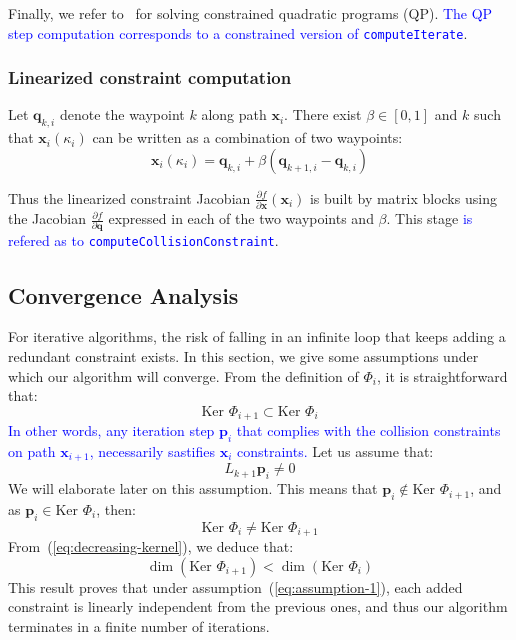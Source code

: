 \documentclass{tADR2e}
\newcommand\p{\mathbf{p}}
\newcommand\conf{\mathbf{q}}
\newcommand\xx{\mathbf{x}} %
\newcommand\tcolli{\kappa_i}
\newcommand\Jf{\Phi}
\newcommand\kernel{\mbox{Ker }}
\begin{document}
\vspace{0.4cm}

Finally, we refer to~\cite{nocedal2006numerical} for solving constrained quadratic 
programs (QP). \textcolor{blue}{The QP step computation corresponds to a constrained 
version of \texttt{computeIterate}}.


\vspace{0.2cm}

\subsubsection{Linearized constraint computation} \label{sec:lin_constr_compt}

Let $\conf_{k,i}$ denote the waypoint $k$ along path $\xx_i$.
There exist $\beta\in[0,1]$ and $k$ such that $\xx_i (\tcolli)$ can be written as a combination of two waypoints:
$$
\xx_i (\tcolli) = \conf_{k,i} + \beta (\conf_{k+1,i} - \conf_{k,i})
$$

Thus the linearized constraint Jacobian $\frac{\partial f}{\partial \xx}(\xx_i)$ 
is built by matrix 
blocks using the Jacobian $\frac{\partial f}{\partial \conf}$ expressed in 
each of the two waypoints and $\beta$. This stage \textcolor{blue}{is refered as 
to \texttt{computeCollisionConstraint}}.


\subsection{Convergence Analysis}
For iterative algorithms, the risk of falling in an infinite loop 
that keeps adding a redundant constraint exists.
In this section, we give some assumptions under which our 
algorithm will converge.
From the definition of $\Jf_{i}$, it is straightforward that:
\begin{equation}\label{eq:decreasing-kernel}
\kernel \Jf_{i+1} \subset \kernel \Jf_{i}
\end{equation}
\textcolor{blue}{In other words, any iteration step $\p_i$ that complies with the 
collision constraints on path $\xx_{i+1}$, necessarily sastifies $\xx_i$ constraints.}
Let us assume that:
\begin{equation}\label{eq:assumption-1}
L_{k+1}\p_i \not= 0
\end{equation}
We will elaborate later on this assumption. This means that 
$\p_{i}\notin\kernel \Jf_{i+1}$, and as $\p_{i}\in\kernel \Jf_{i}$, then:
$$
\kernel \Jf_i \not= \kernel \Jf_{i+1}
$$
From~(\ref{eq:decreasing-kernel}), we deduce that:
$$
\dim (\kernel \Jf_{i+1}) < \dim (\kernel \Jf_i)
$$
This result proves that under assumption~(\ref{eq:assumption-1}), each added constraint 
is linearly independent from the 
previous ones, and thus our algorithm terminates in a finite number of iterations.
\end{document}
